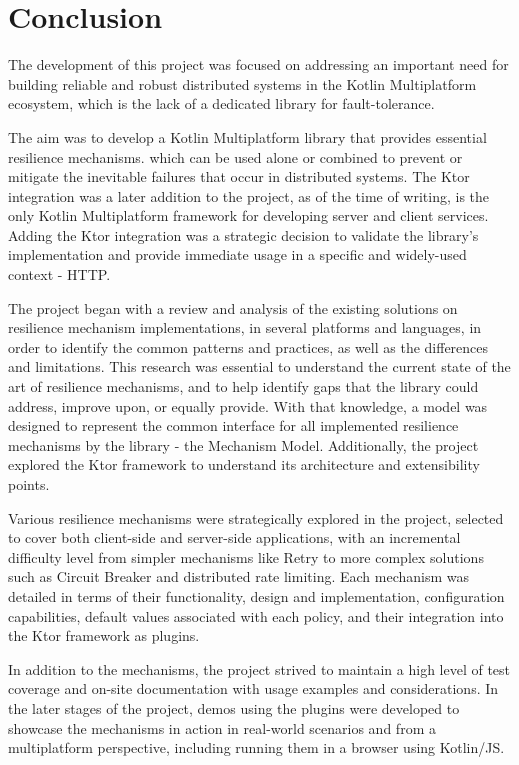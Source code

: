 \chapter{Conclusion}\label{ch:conclusion}

The development of this project was focused
on addressing an important need
for building reliable and robust distributed systems in the Kotlin Multiplatform ecosystem, which is the lack of a dedicated library for fault-tolerance.

The aim was to develop a Kotlin Multiplatform library
that provides essential resilience mechanisms.
which can be used alone or combined to prevent or mitigate the inevitable failures that occur in distributed systems.
The Ktor integration was a later addition to the project, as of the time of writing,
is the only Kotlin Multiplatform framework for developing server and client services.
Adding the Ktor integration was a strategic decision to validate the library's implementation
and provide immediate usage in a specific and widely-used context - HTTP.

The project began with a review and analysis
of the existing solutions on resilience mechanism implementations,
in several platforms and languages,
in order to identify the common patterns and practices, as well as the differences and limitations.
This research was essential to understand the current state of the art of resilience mechanisms,
and to help identify gaps that the library could address, improve upon, or equally provide.
With that knowledge,
a model was designed to represent the common interface for all implemented resilience mechanisms by the library -
the Mechanism Model.
Additionally, the project explored the Ktor framework to understand its architecture and extensibility points.

Various resilience mechanisms were strategically explored in the project,
selected to cover both client-side and server-side applications,
with an incremental difficulty level from simpler mechanisms like Retry to more complex solutions such as Circuit Breaker and distributed rate limiting.
Each mechanism was detailed in terms of their functionality, design and implementation, configuration capabilities, default values associated with each policy, and their integration into the Ktor framework as plugins.

In addition to the mechanisms,
the project strived
to maintain a high level of test coverage and on-site documentation with usage examples and considerations.
In the later stages of the project,
demos using the plugins were developed
to showcase the mechanisms in action in real-world scenarios and from a multiplatform perspective,
including running them in a browser using Kotlin/JS.


